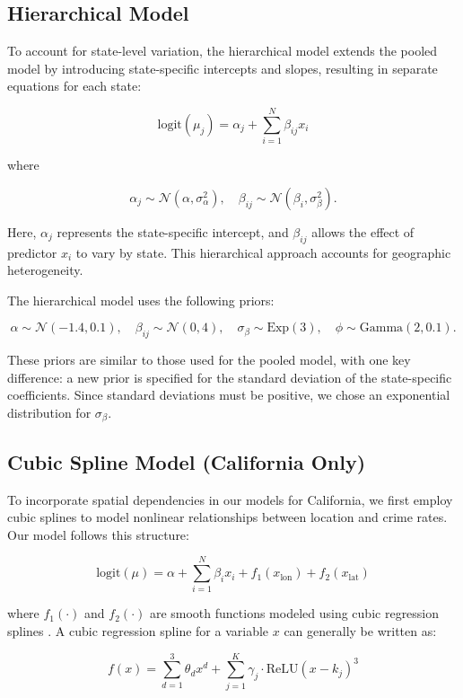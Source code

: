 \documentclass[12pt]{article}
\begin{document}
\subsection{Hierarchical Model}

To account for state-level variation, the hierarchical model extends the pooled model by introducing state-specific intercepts and slopes, resulting in separate equations for each state:

\[
\text{logit}(\mu_j) = \alpha_j + \sum_{i=1}^{N} \beta_{ij} x_i
\]

where

\[
\alpha_j \sim \mathcal{N}(\alpha, \sigma_{\alpha}^2), \quad \beta_{ij} \sim \mathcal{N}(\beta_i, \sigma_{\beta}^2).
\]

Here, \( \alpha_j \) represents the state-specific intercept, and \( \beta_{ij} \) allows the effect of predictor \( x_i \) to vary by state. This hierarchical approach accounts for geographic heterogeneity.

The hierarchical model uses the following priors:

\[
\alpha \sim \mathcal{N}(-1.4, 0.1), \quad \beta_{ij} \sim \mathcal{N}(0,4), \quad \sigma_{\beta} \sim \text{Exp}(3), \quad \phi \sim \text{Gamma}(2,0.1).
\]

These priors are similar to those used for the pooled model, with one key difference: a new prior is specified for the standard deviation of the state-specific coefficients. Since standard deviations must be positive, we chose an exponential distribution for \( \sigma_{\beta} \).
 
\subsection{Cubic Spline Model (California Only)}

To incorporate spatial dependencies in our models for California, we first employ cubic splines to model nonlinear relationships between location and crime rates. Our model follows this structure:

\[
\text{logit}(\mu) = \alpha + \sum_{i=1}^{N} \beta_i x_i + f_1(x_{\text{lon}}) + f_2(x_{\text{lat}})
\]

where \( f_1(\cdot) \) and \( f_2(\cdot) \) are smooth functions modeled using cubic regression splines \parencite{wood2023mgcv}. A cubic regression spline for a variable \( x \) can generally be written as:

\[
f(x) = \sum_{d=1}^{3} \theta_d x^{d} + \sum_{j=1}^{K} \gamma_j \cdot \text{ReLU}(x - k_j)^3
\]
\end{document}

